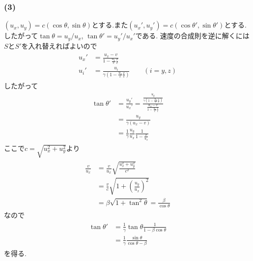 \documentclass[uplatex,a4j,11pt,dvipdfmx]{jsarticle}
\begin{document}
\subsubsection*{(3)}
$(u_x,u_y)=c(\cos\theta,\sin\theta)$とする.また$(u_x',u_y')=c(\cos\theta',\sin\theta')$とする.
したがって$\tan\theta=u_y/u_x$, $\tan\theta'=u_y'/u_x'$である.
速度の合成則を逆に解くには$S$と$S'$を入れ替えればよいので
\begin{align}
  \begin{split}
    u_x'&=\frac{u_x-v}{1-\frac{u_x}{c}\frac{v}{c}}\\
    u_i'&=\frac{u_i}{\gamma\left(1-\frac{u_x}{c}\frac{v}{c}\right)}\qquad(i=y,z)
  \end{split}
\end{align}
したがって
\begin{align}
  \begin{split}
    \tan\theta'&=\frac{u_y'}{u_x'}
    =\frac{\frac{u_y}{\gamma\left(1-\frac{u_x}{c}\frac{v}{c}\right)}}{\frac{u_x-v}{1-\frac{u_x}{c}\frac{v}{c}}}\\
    &=\frac{u_y}{\gamma(u_x-v)}\\
    &=\frac{1}{\gamma}\frac{u_y}{u_x}\frac{1}{1-\frac{v}{u_x}}
  \end{split}
\end{align}
ここで$c=\sqrt{u_x^2+u_y^2}$より
\begin{align}
  \begin{split}
    \frac{v}{u_x}&=\frac{v}{u_x}\sqrt{\frac{u_x^2+u_y^2}{c^2}}\\
    &=\frac{v}{c}\sqrt{1+\left(\frac{u_y}{u_x}\right)^2}\\
    &=\beta\sqrt{1+\tan^2\theta}=\frac{\beta}{\cos\theta}
  \end{split}
\end{align}
なので
\begin{align}
  \begin{split}
    \tan\theta'&=\frac{1}{\gamma}\tan\theta\frac{1}{1-\beta\cos\theta}\\
    &=\frac{1}{\gamma}\frac{\sin\theta}{\cos\theta-\beta}
  \end{split}
\end{align}
を得る.
\end{document}
